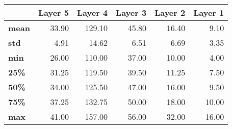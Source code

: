 \begin{tabular}{lrrrrr}
\toprule
{} &  Layer 5 &  Layer 4 &  Layer 3 &  Layer 2 &  Layer 1 \\
\midrule
\textbf{mean} &    33.90 &   129.10 &    45.80 &    16.40 &     9.10 \\
\textbf{std } &     4.91 &    14.62 &     6.51 &     6.69 &     3.35 \\
\textbf{min } &    26.00 &   110.00 &    37.00 &    10.00 &     4.00 \\
\textbf{25\% } &    31.25 &   119.50 &    39.50 &    11.25 &     7.50 \\
\textbf{50\% } &    34.00 &   125.50 &    47.00 &    16.00 &     9.50 \\
\textbf{75\% } &    37.25 &   132.75 &    50.00 &    18.00 &    10.00 \\
\textbf{max } &    41.00 &   157.00 &    56.00 &    32.00 &    16.00 \\
\bottomrule
\end{tabular}
